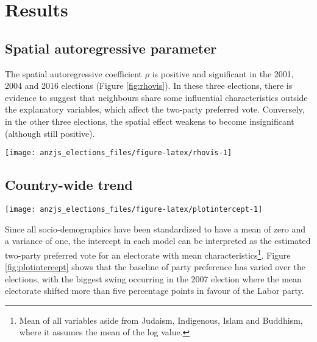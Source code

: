 \documentclass[times, doublespace]{anzsauth}
\let\rmarkdownfootnote\footnote%
\def\footnote{\protect\rmarkdownfootnote}
\let\origfigure\figure
\let\endorigfigure\endfigure
\renewenvironment{figure}[1][2] {
    \expandafter\origfigure\expandafter[htbp]
} {
    \endorigfigure
}
\begin{document}
\hypertarget{results}{%
\section{Results}\label{results}}

\hypertarget{spatial-autoregressive-parameter}{%
\subsection{Spatial autoregressive parameter}\label{spatial-autoregressive-parameter}}

The spatial autoregressive coefficient \(\rho\) is positive and significant in the 2001, 2004 and 2016 elections (Figure \ref{fig:rhovis}). In these three elections, there is evidence to suggest that neighbours share some influential characteristics outside the explanatory variables, which affect the two-party preferred vote. Conversely, in the other three elections, the spatial effect weakens to become insignificant (although still positive).

\begin{figure}[h]

{\centering \texttt{[image: anzjs\_elections\_files/figure-latex/rhovis-1]} 

}

\caption{Estimates of the spatial autoregressive parameter for each of the six elections, reported with their individual 95\% confidence intervals. In 2001, 2004 and 2016 there is a significant spatial component.}\label{fig:rhovis}
\end{figure}

\hypertarget{country-wide-trend}{%
\subsection{Country-wide trend}\label{country-wide-trend}}

\begin{figure}[h]

{\centering \texttt{[image: anzjs\_elections\_files/figure-latex/plotintercept-1]} 

}

\caption{Estimated intercept for each election, which represents the two-party preferred vote for an electorate with mean characteristics.}\label{fig:plotintercept}
\end{figure}

Since all socio-demographics have been standardized to have a mean of zero and a variance of one, the intercept in each model can be interpreted as the estimated two-party preferred vote for an electorate with mean characteristics\footnote{Mean of all variables aside from Judaism, Indigenous, Islam and Buddhism, where it assumes the mean of the log value.}. Figure \ref{fig:plotintercept} shows that the baseline of party preference has varied over the elections, with the biggest swing occurring in the 2007 election where the mean electorate shifted more than five percentage points in favour of the Labor party.
\end{document}
